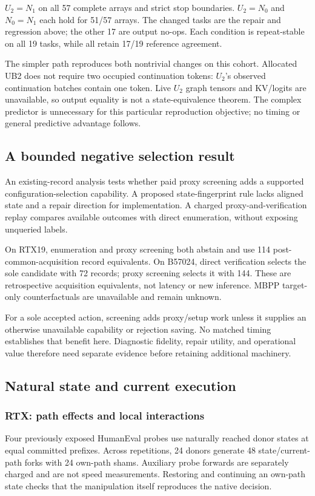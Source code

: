$U_2=N_1$ on all 57 complete arrays and strict stop boundaries. $U_2=N_0$ and $N_0=N_1$ each hold for 51/57 arrays. The changed tasks are the repair and regression above; the other 17 are output no-ops. Each condition is repeat-stable on all 19 tasks, while all retain 17/19 reference agreement.

The simpler path reproduces both nontrivial changes on this cohort. Allocated UB2 does not require two occupied continuation tokens: $U_2$'s observed continuation batches contain one token. Live $U_2$ graph tensors and KV/logits are unavailable, so output equality is not a state-equivalence theorem. The complex predictor is unnecessary for this particular reproduction objective; no timing or general predictive advantage follows.

\subsection{A bounded negative selection result}
An existing-record analysis tests whether paid proxy screening adds a supported configuration-selection capability. A proposed state-fingerprint rule lacks aligned state and a repair direction for implementation. A charged proxy-and-verification replay compares available outcomes with direct enumeration, without exposing unqueried labels.

On RTX19, enumeration and proxy screening both abstain and use 114 post-common-acquisition record equivalents. On B57024, direct verification selects the sole candidate with 72 records; proxy screening selects it with 144. These are retrospective acquisition equivalents, not latency or new inference. MBPP target-only counterfactuals are unavailable and remain unknown.

For a sole accepted action, screening adds proxy/setup work unless it supplies an otherwise unavailable capability or rejection saving. No matched timing establishes that benefit here. Diagnostic fidelity, repair utility, and operational value therefore need separate evidence before retaining additional machinery.


\subsection{Natural state and current execution}

\label{sec:cross}
\subsubsection{RTX: path effects and local interactions}
Four previously exposed HumanEval probes use naturally reached donor states at equal committed prefixes. Across repetitions, 24 donors generate 48 state/current-path forks with 24 own-path shams. Auxiliary probe forwards are separately charged and are not speed measurements. Restoring and continuing an own-path state checks that the manipulation itself reproduces the native decision.

